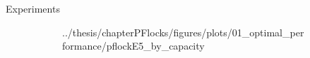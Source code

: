 \begin{frame}{Experiments}
\begin{figure}
\begin{subfigure}[t]{0.32\textwidth}
{                {../thesis/chapterPFlocks/figures/plots/01_optimal_performance/pflockE5_by_capacity}}
            \end{subfigure}
            \hfill
            \begin{subfigure}[t]{0.32\textwidth}
            \end{subfigure}
            \begin{subfigure}[t]{0.32\textwidth}
\end{subfigure}
\end{figure}
\end{frame}
